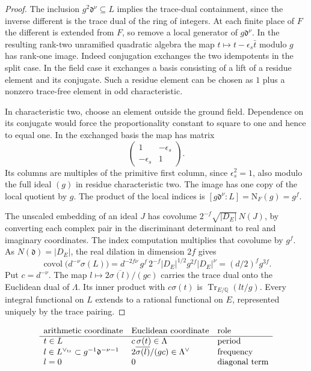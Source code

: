 \begin{proof}
The inclusion \(g^2\mathfrak d^\nu\subseteq L\) implies the
trace-dual containment, since the inverse different is the
trace dual of the ring of integers. At each
finite place of \(F\) the different is extended from \(F\), so
remove a local generator of \(g\mathfrak d^\nu\). In the resulting
rank-two unramified quadratic algebra the map
\(t\mapsto t-\epsilon_s\bar t\) modulo \(g\) has rank-one image.
Indeed conjugation exchanges the two idempotents in the split
case. In the field case it exchanges a basis consisting of a
lift of a residue element and its conjugate. Such a residue
element can be chosen as \(1\) plus a nonzero trace-free element
in odd characteristic.

In characteristic two, choose an element
outside the ground field. Dependence on its conjugate would
force the proportionality constant to square to one and hence
to equal one. In the exchanged basis the map has matrix
\[
 \begin{pmatrix}1&-\epsilon_s\\-\epsilon_s&1\end{pmatrix}.
\]
Its columns are multiples of the primitive first column, since
\(\epsilon_s^2=1\), also modulo the full ideal \((g)\) in residue
characteristic two. The image has one copy of the local
quotient by \(g\). The product of the local indices is
\([g\mathfrak d^\nu:L]=\mathrm N_F(g)=g^f\).

The unscaled embedding of an ideal \(J\) has covolume
\(2^{-f}\sqrt{|D_E|}\,N(J)\), by converting each complex pair in
the discriminant determinant to real and imaginary coordinates.
The index computation multiplies that covolume by \(g^f\).
As \(N(\mathfrak d)=|D_E|\), the real dilation in dimension \(2f\)
gives
\[
 \operatorname{covol}\bigl(d^{-\nu}\sigma(L)\bigr)
 =d^{-2f\nu}\,g^f\,2^{-f}|D_E|^{1/2}
     g^{2f}|D_E|^\nu=(d/2)^f g^{3f}.
\]
Put \(c=d^{-\nu}\). The map
\(l\mapsto 2\overline{\sigma(l)}/(gc)\) carries the trace dual
onto the Euclidean dual of \(\Lambda\). Its inner product with
\(c\sigma(t)\) is \(\operatorname{Tr}_{E/\mathbb Q}(lt/g)\).
Every integral functional on \(L\) extends to a rational
functional on \(E\), represented uniquely by the trace pairing.

\end{proof}

\begin{construction}
\[
\begin{array}{lll}
\text{arithmetic coordinate}&\text{Euclidean coordinate}&\text{role}\\ \hline
t\in L & c\,\sigma(t)\in\Lambda&\text{period}\\
l\in L^{\vee_{\rm tr}}\subset g^{-1}\mathfrak d^{-\nu-1}
    &2\overline{\sigma(l)}/(gc)\in\Lambda^\vee&\text{frequency}\\
l=0 &0&\text{diagonal term}
\end{array}
\]
\caption{The two coordinates for Fourier frequencies. A trace-dual element \(l\) is converted to the Euclidean frequency before Poisson summation.}\label{fig:period-dual-readings}
\end{construction}

